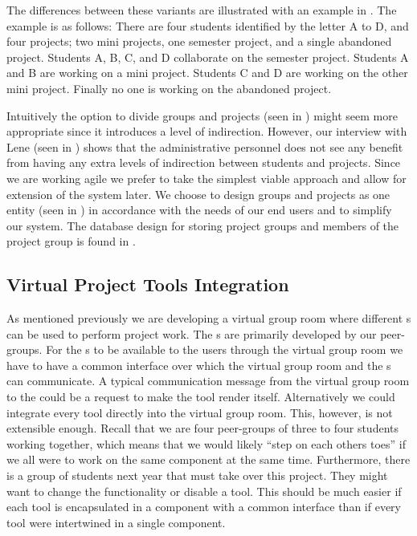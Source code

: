The differences between these variants are illustrated with an example in .
The example is as follows:
There are four students identified by the letter A to D, and four projects; two mini projects, one semester project, and a single abandoned project.
Students A, B, C, and D collaborate on the semester project.
Students A and B are working on a mini project.
Students C and D are working on the other mini project.
Finally no one is working on the abandoned project.

Intuitively the option to divide groups and projects (seen in ) might seem more appropriate since it introduces a level of indirection.
However, our interview with Lene (seen in ) shows that the administrative personnel does not see any benefit from having any extra levels of indirection between students and projects.
Since we are working agile we prefer to take the simplest viable approach and allow for extension of the system later.
We choose to design groups and projects as one entity (seen in ) in accordance with the needs of our end users and to simplify our system.
The database design for storing project groups and members of the project group is found in .

\subsection{Virtual Project Tools Integration}
\label{sub:interActivities}
As mentioned previously we are developing a virtual group room where different \detdeandrelaver[]s can be used to perform project work.
The \detdeandrelaver[]s are primarily developed by our peer-groups.
For the \detdeandrelaver[]s to be available to the users through the virtual group room we have to have a common interface over which the virtual group room and the \detdeandrelaver[]s can communicate.
A typical communication message from the virtual group room to the \detdeandrelaver{} could be a request to make the tool render itself.
Alternatively we could integrate every tool directly into the virtual group room.
This, however, is not extensible enough.
Recall that we are four peer-groups of three to four students working together, which means that we would likely ``step on each others toes'' if we all were to work on the same component at the same time.
Furthermore, there is a group of students next year that must take over this project.
They might want to change the functionality or disable a tool.
This should be much easier if each tool is encapsulated in a component with a common interface than if every tool were intertwined in a single component.

